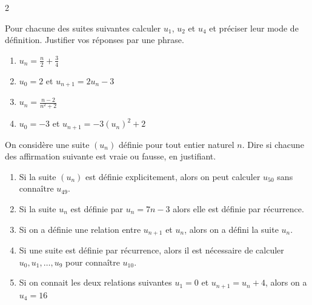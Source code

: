 \documentclass[10pt,a4paper]{article}
\begin{document}
\begin{multicols}{2}
\begin{exo}
    Pour chacune des suites suivantes calculer $u_1$, $u_2$ et $u_4$ et préciser leur mode de définition. Justifier vos réponses par une phrase.

    \begin{enumerate}
        \item $u_n=\frac{n}{2}+\frac{3}{4}$
    
        \item $u_0 = 2$ et $u_{n+1}  =  2u_n-3$

        \item $u_n=\frac{n-2}{n^2+2}$

        \item $u_0 = -3$ et $u_{n+1}  =  -3(u_n)^2+2$

    \end{enumerate}
    
\end{exo}

\begin{exo}
On considère une suite \((u_n)\) définie pour tout entier naturel \(n\). Dire si chacune des affirmation suivante est vraie ou fausse, en justifiant.

\begin{enumerate}[leftmargin=*]
    \item Si la suite \((u_n)\) est définie explicitement, alors on peut calculer \(u_{50}\) sans connaître \(u_{49}\).
    \item Si la suite \(u_n\) est définie par \(u_n = 7n-3\) alors elle est définie par récurrence.
    \item Si on a définie une relation entre \(u_{n+1}\) et \(u_n\), alors on a défini la suite \(u_n\).
    \item Si une suite est définie par récurrence, alors il est nécessaire de calculer \(u_0, u_1, \ldots, u_9\) pour connaître \(u_{10}\).
    \item Si on connait les deux relations suivantes \(u_1 = 0\) et \(u_{n+1} = u_n +4\), alors on a \(u_4=16\)
\end{enumerate}
\end{exo}



\end{multicols}
\end{document}

